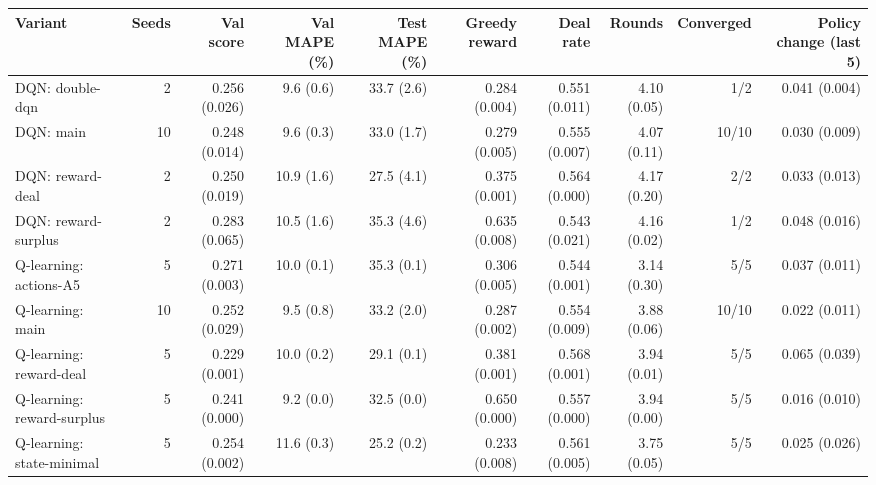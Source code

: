 \begin{tabular}{lrrrrrrrrr}
\toprule
Variant & Seeds & Val score & Val MAPE (\%) & Test MAPE (\%) & Greedy reward & Deal rate & Rounds & Converged & Policy change (last 5) \\
\midrule
DQN: double-dqn & 2 & 0.256 (0.026) & 9.6 (0.6) & 33.7 (2.6) & 0.284 (0.004) & 0.551 (0.011) & 4.10 (0.05) & 1/2 & 0.041 (0.004) \\
DQN: main & 10 & 0.248 (0.014) & 9.6 (0.3) & 33.0 (1.7) & 0.279 (0.005) & 0.555 (0.007) & 4.07 (0.11) & 10/10 & 0.030 (0.009) \\
DQN: reward-deal & 2 & 0.250 (0.019) & 10.9 (1.6) & 27.5 (4.1) & 0.375 (0.001) & 0.564 (0.000) & 4.17 (0.20) & 2/2 & 0.033 (0.013) \\
DQN: reward-surplus & 2 & 0.283 (0.065) & 10.5 (1.6) & 35.3 (4.6) & 0.635 (0.008) & 0.543 (0.021) & 4.16 (0.02) & 1/2 & 0.048 (0.016) \\
Q-learning: actions-A5 & 5 & 0.271 (0.003) & 10.0 (0.1) & 35.3 (0.1) & 0.306 (0.005) & 0.544 (0.001) & 3.14 (0.30) & 5/5 & 0.037 (0.011) \\
Q-learning: main & 10 & 0.252 (0.029) & 9.5 (0.8) & 33.2 (2.0) & 0.287 (0.002) & 0.554 (0.009) & 3.88 (0.06) & 10/10 & 0.022 (0.011) \\
Q-learning: reward-deal & 5 & 0.229 (0.001) & 10.0 (0.2) & 29.1 (0.1) & 0.381 (0.001) & 0.568 (0.001) & 3.94 (0.01) & 5/5 & 0.065 (0.039) \\
Q-learning: reward-surplus & 5 & 0.241 (0.000) & 9.2 (0.0) & 32.5 (0.0) & 0.650 (0.000) & 0.557 (0.000) & 3.94 (0.00) & 5/5 & 0.016 (0.010) \\
Q-learning: state-minimal & 5 & 0.254 (0.002) & 11.6 (0.3) & 25.2 (0.2) & 0.233 (0.008) & 0.561 (0.005) & 3.75 (0.05) & 5/5 & 0.025 (0.026) \\
\bottomrule
\end{tabular}
